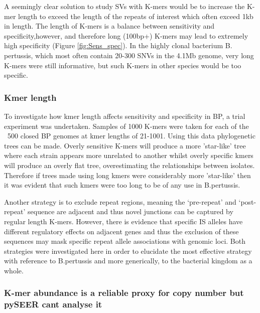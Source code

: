 \documentclass{article}
\begin{document}
A seemingly clear solution to study SVs with K-mers would be to increase the K-mer length to exceed the length of the repeats of interest which often exceed 1kb in length. The length of K-mers is a balance between sensitivity and specificity,however, and therefore  long (100bp+) K-mers may lead to extremely high specificity (Figure \ref{fig:Sens_spec}). In the highly clonal bacterium B. pertussis, which most often contain 20-300 SNVs in the 4.1Mb genome, very long K-mers were still informative, but such K-mers in other species would be too specific.

\subsubsection{Kmer length }

To investigate how kmer length affects sensitivity and specificity in BP, a trial experiment was undertaken. Samples of 1000 K-mers were taken for each of the ~500 closed BP genomes at kmer lengths of 21-1001. Using this data phylogenetic trees can be made. Overly sensitive K-mers will produce a more 'star-like' tree where each strain appears more unrelated to another whilst overly specific kmers will produce an overly flat tree, overestimating the relationships between isolates. Therefore if trees made using long kmers were considerably more 'star-like' then it was evident that such kmers were too long to be of any use in B.pertussis.






Another strategy is to exclude repeat regions, meaning the `pre-repeat' and `post-repeat' sequence are adjacent and thus novel junctions can be captured by regular length K-mers. However, there is evidence that specific IS alleles have different regulatory effects on adjacent genes and thus the exclusion of these sequences may mask specific repeat allele associations with genomic loci. Both strategies were investigated here in order to elucidate the most effective strategy with reference to B.pertussis and more generically, to the bacterial kingdom as a whole.

\subsubsection{K-mer abundance is a reliable proxy for copy number but pySEER cant analyse it}
\end{document}
